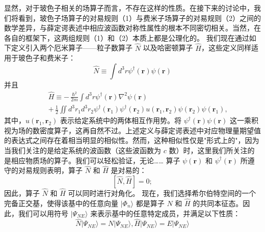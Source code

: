 显然，对于玻色子相关的场算子而言，不存在这样的性质。在接下来的讨论中，我们将看到，玻色子场算子的对易规则（1）与费米子场算子的对易规则（2）之间的数学差异，与薛定谔表述中相应波函数对称性属性的根本不同密切相关。当然，在各自的框架下，这两组规则（1）和（2）本质上都是公理化的。
我们现在通过如下定义引入两个厄米算子——粒子数算子 \(\hat{N}\) 以及哈密顿算子 \(\hat{H}\)，这些定义同样适用于玻色子和费米子：
\begin{equation}\tag{11.1.7}\label{eq:11.1.7}
\hat { N } \equiv \int d ^{3} r \psi ^{\dagger} ( \pmb { r } ) \psi \left( \pmb { r } \right)
\end{equation}
并且
\begin{equation}\tag{11.1.8}\label{eq:11.1.8}
\begin{array}{rlr} & { } & { \hat { H } \equiv - \, \frac { \hbar ^{2} } { 2 m } \int d ^{3} r \psi ^{\dagger} ( \pmb { r } ) \nabla ^{2} \psi ( \pmb { r } ) } \\& { } & { + \, \frac { 1 } { 2 } \iint d ^{3} r _ { 1 } d ^{3} r _ { 2 } \psi ^{\dagger} ( \pmb { r } _ { 1 } ) \psi ^{\dagger} ( \pmb { r } _ { 2 } ) u ( \pmb { r } _ { 1 } , \pmb { r } _ { 2 } ) \psi ( \pmb { r } _ { 2 } ) \psi ( \pmb { r } _ { 1 } ) , } \end{array}
\end{equation}
其中，\(u(\boldsymbol{r}_{1}, \boldsymbol{r}_{2})\) 表示给定系统中的两体相互作用势。将 \(\psi^{\dagger}(\boldsymbol{r})\psi(\boldsymbol{r})\) 这一乘积视为场的数密度算子，这再自然不过。上述定义与薛定谔表述中对应物理量期望值的表达式之间存在着相当明显的相似性。然而，这种相似性仅是"形式上的"，因为当我们关注的是给定系统的波函数（这些波函数为 \(c\) 数）时，这里我们所关注的是相应物质场的算子。我们可以轻松验证，无论\ldots\ldots{}
算子 \(\psi(\boldsymbol{r})\) 和 \(\psi^\dagger(\boldsymbol{r})\) 所遵守的对易规则表明，算子 \(\hat{N}\) 和 \(\hat{H}\) 是对易的：
\begin{equation}\tag{11.1.9}\label{eq:11.1.9}
[ \hat { N } , \hat { H } ] = 0 ;
\end{equation}
因此，算子 \(\hat{N}\) 和 \(\hat{H}\) 可以同时进行对角化。
现在，我们选择希尔伯特空间的一个完备正交基，使得该基中的任意向量 \(|\Phi_{n}\rangle\) 都是算子 \(\hat{N}\) 和 \(\hat{H}\) 的共同本征态。因此，我们可以用符号 \(|\Psi_{NE}\rangle\) 来表示基中的任意特定成员，并满足以下性质：
\begin{equation}\tag{11.1.10}\label{eq:11.1.10}
\hat { N } | \Psi _ { N E } \rangle = N | \Psi _ { N E } \rangle ,  \hat { H } | \Psi _ { N E } \rangle = E | \Psi _ { N E } \rangle
\end{equation}
